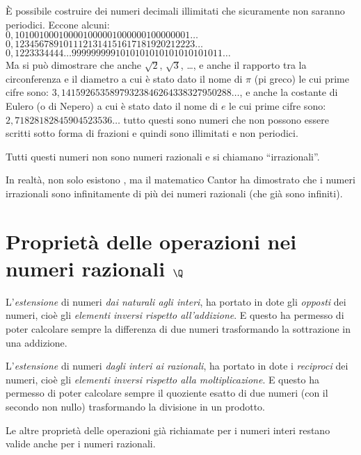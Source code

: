 È possibile costruire dei numeri decimali illimitati che sicuramente non 
saranno periodici. Eccone alcuni:\\
\(0,101001000100001000001000000100000001\dots\)\\
\(0,1234567891011121314151617181920212223\dots\)\\
\(0,1223334444\dots9999999991010101010101010101011\dots\)\\
Ma si può dimostrare che anche \(\sqrt{2}\), \(\sqrt{3}\), \dots, 
e anche il rapporto tra la circonferenza e il diametro a cui è stato dato 
il nome di \(\pi\) (pi greco) le cui prime cifre sono: 
\(3,14159265358979323846264338327950288\!\dots\), 
e anche la costante di Eulero (o di Nepero) a cui è stato dato il nome di 
\(e\) le cui prime cifre sono:
\(2,71828182845904523536\!\dots\)
tutto questi sono 
numeri che non possono essere scritti sotto forma di frazioni e quindi 
sono illimitati e non periodici.

Tutti questi numeri non sono numeri razionali e si chiamano 
``irrazionali''.

\begin{osservazione}{}{}
In realtà, non solo esistono , ma il matematico Cantor 
ha dimostrato che i numeri irrazionali sono infinitamente di più dei numeri 
razionali (che già sono infiniti).
\end{osservazione}

\section{Proprietà delle operazioni nei numeri razionali $\Q$}
\label{sec:razionali_proprieta}

L'\emph{estensione} di numeri \emph{dai naturali agli interi}, 
ha portato in dote gli \emph{opposti} dei numeri, cioè gli 
\emph{elementi inversi rispetto all'addizione}. 
E questo ha permesso di poter calcolare sempre la differenza di due numeri 
trasformando la sottrazione in una addizione.

L'\emph{estensione} di numeri \emph{dagli interi ai razionali},
ha portato in dote i \emph{reciproci} dei numeri, cioè gli 
\emph{elementi inversi rispetto alla moltiplicazione}. 
E questo ha permesso di poter calcolare sempre il quoziente esatto di due 
numeri (con il secondo non nullo) trasformando la divisione in un prodotto.

Le altre proprietà delle operazioni già richiamate per i numeri interi 
restano valide anche per i numeri razionali.

